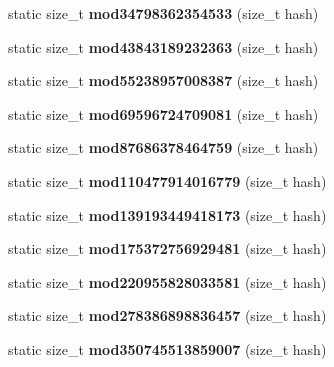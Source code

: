 \begin{DoxyCompactItemize}
\item 
static size\+\_\+t {\bfseries mod34798362354533} (size\+\_\+t hash)\label{structska_1_1prime__number__hash__policy_a2cc5d14b084d02f9924bbaff8c6efe1e}

\item 
static size\+\_\+t {\bfseries mod43843189232363} (size\+\_\+t hash)\label{structska_1_1prime__number__hash__policy_afad91d1e62351df6c0e1953bb413247b}

\item 
static size\+\_\+t {\bfseries mod55238957008387} (size\+\_\+t hash)\label{structska_1_1prime__number__hash__policy_acdc27e29a073cf05373dc1298f736a84}

\item 
static size\+\_\+t {\bfseries mod69596724709081} (size\+\_\+t hash)\label{structska_1_1prime__number__hash__policy_a760e8cc50a87d5d489cbfaee2fd6bc1e}

\item 
static size\+\_\+t {\bfseries mod87686378464759} (size\+\_\+t hash)\label{structska_1_1prime__number__hash__policy_a09087ab6adb75b0c4bef5ed5b7f7d82f}

\item 
static size\+\_\+t {\bfseries mod110477914016779} (size\+\_\+t hash)\label{structska_1_1prime__number__hash__policy_ab4c42b8aa329ce3f6c83f98e637dfb0a}

\item 
static size\+\_\+t {\bfseries mod139193449418173} (size\+\_\+t hash)\label{structska_1_1prime__number__hash__policy_ab3e6639ae84e84357008db116ff227af}

\item 
static size\+\_\+t {\bfseries mod175372756929481} (size\+\_\+t hash)\label{structska_1_1prime__number__hash__policy_ae151c5885f656fe3b8ee6b5097f6b569}

\item 
static size\+\_\+t {\bfseries mod220955828033581} (size\+\_\+t hash)\label{structska_1_1prime__number__hash__policy_af03982d0f4f836432720c38b044a5aee}

\item 
static size\+\_\+t {\bfseries mod278386898836457} (size\+\_\+t hash)\label{structska_1_1prime__number__hash__policy_ae3b9920a47ae22e20470ba5f331cafc9}

\item 
static size\+\_\+t {\bfseries mod350745513859007} (size\+\_\+t hash)\label{structska_1_1prime__number__hash__policy_a76f9e81336d03916f1a60d4a68129447}


\end{DoxyCompactItemize}
